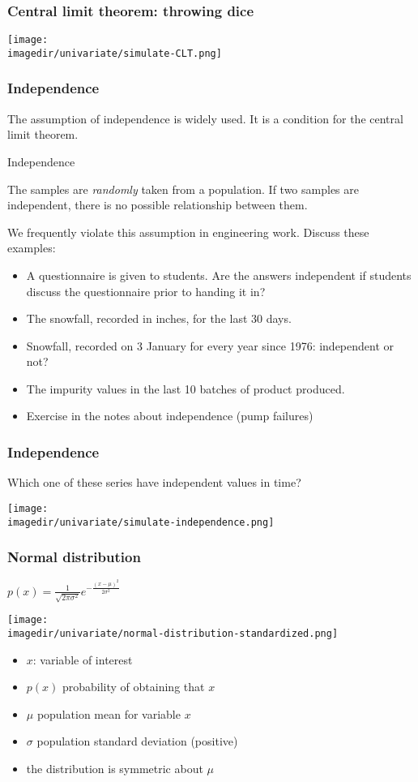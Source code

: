 \begin{frame}\frametitle{Central limit theorem: throwing dice}

	\texttt{[image: \\imagedir/univariate/simulate-CLT.png]}
\end{frame}

\begin{frame}\frametitle{Independence}

	The assumption of independence is widely used. It is a condition for the central limit theorem.
	\begin{block}
		{Independence}
		\begin{center}
			The samples are \emph{randomly} taken from a population. If two samples are independent, there is no possible relationship between them.
		\end{center}
	\end{block}

	We frequently violate this assumption in engineering work. Discuss these examples:
	\begin{itemize}
		\item	A questionnaire is given to students. Are the answers independent if students discuss the questionnaire prior to handing it in?
		\item	The snowfall, recorded in inches, for the last 30 days.
		\item	Snowfall, recorded on 3 January for every year since 1976: independent or not?
		\item	The impurity values in the last 10 batches of product produced.
		\item	Exercise in the notes about independence (pump failures)
	\end{itemize}
\end{frame}

\begin{frame}\frametitle{Independence}

	Which one of these series have independent values in time?

	\texttt{[image: \\imagedir/univariate/simulate-independence.png]}
\end{frame}

\begin{frame}\frametitle{Normal distribution}

	$ p(x) = \displaystyle \frac{1}{\sqrt{2\pi \sigma^2}}e^{-\frac{\displaystyle (x-\mu)^2}{\displaystyle 2\sigma^2}} $
	\begin{center}
		\texttt{[image: \\imagedir/univariate/normal-distribution-standardized.png]}
	\end{center}
	\begin{itemize}
		\item	$x$: variable of interest
		\item	$p(x)$ probability of obtaining that $x$
		\item	$\mu$ population mean for variable $x$
		\item	$\sigma$ population standard deviation (positive)
		\item	the distribution is symmetric about $\mu$
	\end{itemize}
\end{frame}

